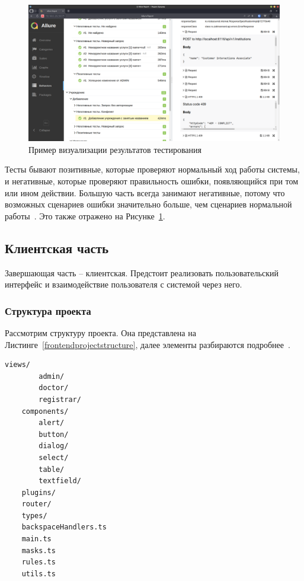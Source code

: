 \documentclass[a4paper,article]{article}
\begin{document}
\begin{sloppypar}
    \begin{figure}[h]
        \centering
        \includegraphics[width=0.8\linewidth]{Allure.png}
        \caption{\centering Пример визуализации результатов тестирования}
        \label{fig:Allure}
    \end{figure}

    Тесты бывают позитивные, которые проверяют нормальный ход работы системы, и негативные, которые проверяют правильность ошибки, появляющийся при том или ином действии. Большую часть всегда занимают негативные, потому что возможных сценариев ошибки значительно больше, чем сценариев нормальной работы~\cite{baeldungbook}. Это также отражено на Рисунке~\ref{fig:Allure}.

    \newpage

    \subsection{Клиентская часть}\label{Реализация. Клиентская часть}

    Завершающая часть -- клиентская. Предстоит реализовать пользовательский интерфейс и взаимодействие пользователя с системой через него.

    \subsubsection{Структура проекта}\label{Реализация. Клиентская часть. Структура проекта}

    Рассмотрим структуру проекта. Она представлена на Листинге~\ref{frontendprojectstructure}, далее элементы разбираются подробнее~\cite{vuejs}.

    \begin{lstlisting}[label=frontendprojectstructure,caption=Структура клиентского приложения]
    views/
        admin/
        doctor/
        registrar/
    components/
        alert/
        button/
        dialog/
        select/
        table/
        textfield/
    plugins/
    router/
    types/
    backspaceHandlers.ts
    main.ts
    masks.ts
    rules.ts
    utils.ts
    \end{lstlisting}


\end{sloppypar}
\end{document}
